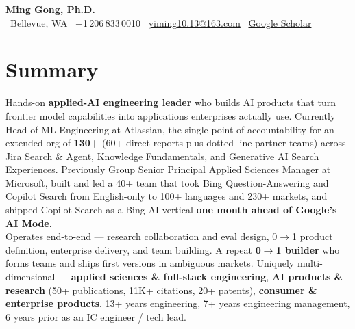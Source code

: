 \documentclass[10.5pt,letterpaper]{article}
\begin{document}
\begin{center}
  {\LARGE\bfseries\color{blue!60!black} Ming Gong, Ph.D.}\\[3pt]
  \faMapMarker* \ Bellevue, WA \quad \textbar \quad
  \faPhone \ +1\,206\,833\,0010 \quad \textbar \quad
  \faEnvelope \ \href{mailto:yiming10.13@163.com}{yiming10.13@163.com} \quad \textbar \quad
  \faGraduationCap \ \href{https://scholar.google.com/citations?user=c7JEFwsAAAAJ}{Google Scholar}
\end{center}

\section*{Summary}
Hands-on \textbf{applied-AI engineering leader} who builds AI products that turn frontier model capabilities into applications enterprises actually use. Currently Head of ML Engineering at Atlassian, the single point of accountability for an extended org of \textbf{130+} (60+ direct reports plus dotted-line partner teams) across Jira Search \& Agent, Knowledge Fundamentals, and Generative AI Search Experiences. Previously Group Senior Principal Applied Sciences Manager at Microsoft, built and led a 40+ team that took Bing Question-Answering and Copilot Search from English-only to 100+ languages and 230+ markets, and shipped Copilot Search as a Bing AI vertical \textbf{one month ahead of Google's AI Mode}.\\[4pt]
Operates end-to-end --- research collaboration and eval design, 0$\to$1 product definition, enterprise delivery, and team building. A repeat \textbf{0$\to$1 builder} who forms teams and ships first versions in ambiguous markets. Uniquely multi-dimensional --- \textbf{applied sciences \& full-stack engineering}, \textbf{AI products \& research} (50+ publications, 11K+ citations, 20+ patents), \textbf{consumer \& enterprise products}. 13+ years engineering, 7+ years engineering management, 6 years prior as an IC engineer / tech lead.

\end{document}
